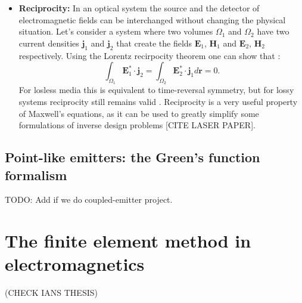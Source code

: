 \begin{itemize}
    \item \textbf{Reciprocity:} In an optical system the source and the detector of electromagnetic fields can be interchanged without changing the physical situation. Let's consider a system where two volumes $\Omega_1$ and $\Omega_2$ 
    have two current densities $\mathbf{j}_1$ and $\mathbf{j}_2$ that create the fields $\mathbf{E}_1$, $\mathbf{H}_1$ and $\mathbf{E}_2$, $\mathbf{H}_2$ respectively. Using the Lorentz recirpocity theorem one can show that \cite{novotny}:      
    \begin{equation}
        \int_{\Omega_1} \mathbf{E}_1^* \cdot \mathbf{j}_2 = \int_{\Omega_2}  \mathbf{E}_2^* \cdot \mathbf{j}_1 d\mathbf{r} = 0.
    \end{equation}
    For losless media this is equivalent to time-reversal symmetry, but for lossy systems reciprocity still remains valid \cite{Carminati:98}. Reciprocity is a very useful property of Maxwell's equations, as it can be used to 
    greatly simplify some formulations of inverse design problems [CITE LASER PAPER].


\end{itemize}

\subsection*{Point-like emitters: the Green's function formalism}

TODO: Add if we do coupled-emitter project.

\section{The finite element method in electromagnetics}

(CHECK IANS THESIS)

